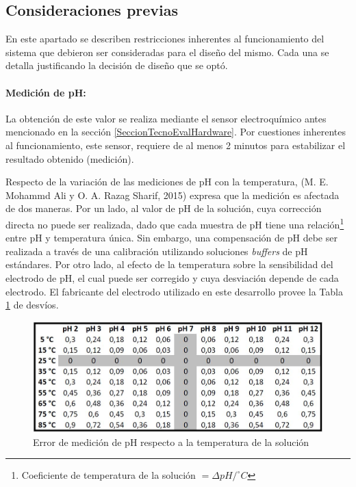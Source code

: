     \subsection{Consideraciones previas}
        \par En este apartado se describen restricciones inherentes al funcionamiento del sistema que debieron ser consideradas para el diseño del mismo. Cada una se detalla justificando la decisión de diseño que se optó.
        
        \paragraph{Medición de pH:} 
            La obtención de este valor se realiza mediante el sensor electroquímico antes mencionado en la sección \ref{SeccionTecnoEvalHardware}. Por cuestiones inherentes al funcionamiento, este sensor, requiere de al menos 2 minutos para estabilizar el resultado obtenido (medición).
            
            \par Respecto de la variación de las mediciones de pH con la temperatura, (M. E. Mohammd Ali y O. A. Razag Sharif, 2015) expresa que la medición es afectada de dos maneras. Por un lado, al valor de pH de la solución, cuya corrección directa no puede ser realizada, dado que cada muestra de pH tiene una relación\footnote{Coeficiente de temperatura de la solución  $ = \Delta pH/ ^{\circ}C $} entre pH y temperatura única. Sin embargo, una compensación de pH debe ser realizada a través de una calibración utilizando soluciones \textit{buffers} de pH estándares. Por otro lado, al efecto de la temperatura sobre la sensibilidad del electrodo de pH, el cual puede ser corregido y cuya desviación depende de cada electrodo. El fabricante del electrodo utilizado en este desarrollo provee la Tabla \ref{tablePhvsTemp} de desvíos. 
            
            \begin{figure}[h] 
                \centering
                \includegraphics[scale=0.6]{hardware/ErrorMedicionPH.jpg}
                \caption{Error de medición de pH respecto a la temperatura de la solución}
                \label{tablePhvsTemp}
            \end{figure}
            
